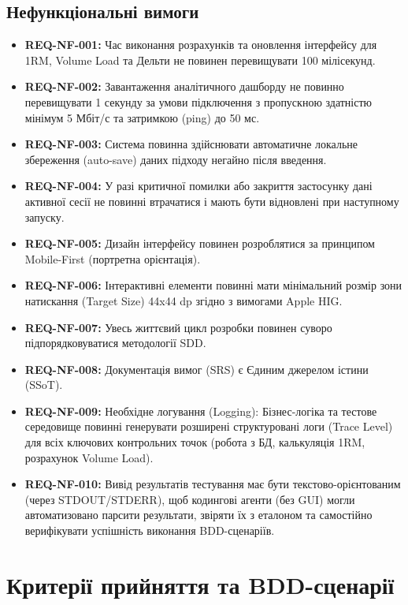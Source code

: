 \documentclass[12pt]{article}
\begin{document}
\subsection{Нефункціональні вимоги}
\begin{itemize}
    \item \textbf{REQ-NF-001:} Час виконання розрахунків та оновлення інтерфейсу для 1RM, Volume Load та Дельти не повинен перевищувати 100 мілісекунд.
    \item \textbf{REQ-NF-002:} Завантаження аналітичного дашборду не повинно перевищувати 1 секунду за умови підключення з пропускною здатністю мінімум 5 Мбіт/с та затримкою (ping) до 50 мс.
    \item \textbf{REQ-NF-003:} Система повинна здійснювати автоматичне локальне збереження (auto-save) даних підходу негайно після введення.
    \item \textbf{REQ-NF-004:} У разі критичної помилки або закриття застосунку дані активної сесії не повинні втрачатися і мають бути відновлені при наступному запуску.
    \item \textbf{REQ-NF-005:} Дизайн інтерфейсу повинен розроблятися за принципом Mobile-First (портретна орієнтація).
    \item \textbf{REQ-NF-006:} Інтерактивні елементи повинні мати мінімальний розмір зони натискання (Target Size) 44x44 dp згідно з вимогами Apple HIG.
    \item \textbf{REQ-NF-007:} Увесь життєвий цикл розробки повинен суворо підпорядковуватися методології SDD.
    \item \textbf{REQ-NF-008:} Документація вимог (SRS) є Єдиним джерелом істини (SSoT).
    \item \textbf{REQ-NF-009:} Необхідне логування (Logging): Бізнес-логіка та тестове середовище повинні генерувати розширені структуровані логи (Trace Level) для всіх ключових контрольних точок (робота з БД, калькуляція 1RM, розрахунок Volume Load).
    \item \textbf{REQ-NF-010:} Вивід результатів тестування має бути текстово-орієнтованим (через STDOUT/STDERR), щоб кодингові агенти (без GUI) могли автоматизовано парсити результати, звіряти їх з еталоном та самостійно верифікувати успішність виконання BDD-сценаріїв.
\end{itemize}

\section{Критерії прийняття та BDD-сценарії}
\end{document}

